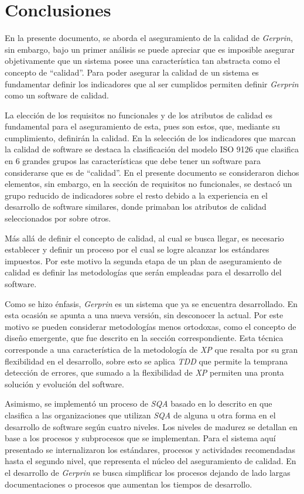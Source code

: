 
\chapter{Conclusiones }

En la presente documento, se aborda el aseguramiento de la calidad de \textit{Gerprin}, sin embargo, bajo un primer análisis se puede apreciar que es imposible asegurar objetivamente que un sistema posee una característica tan abstracta como el concepto de “calidad”. Para poder asegurar la calidad de un sistema es fundamentar definir los indicadores que al ser cumplidos permiten definir \textit{Gerprin} como un software de calidad.

La elección de los requisitos no funcionales y de los atributos de calidad es fundamental para el aseguramiento de esta, pues son estos, que, mediante su cumplimiento, definirán la calidad. En la selección de los indicadores que marcan la calidad de software se destaca la clasificación del modelo ISO 9126 que clasifica en 6 grandes grupos las características que debe tener un software para considerarse que es de “calidad”. En el presente documento se consideraron dichos elementos, sin embargo, en la sección de requisitos no funcionales, se destacó un grupo reducido de indicadores sobre el resto debido a la experiencia en el desarrollo de software similares, donde primaban los atributos de calidad seleccionados por sobre otros.

Más allá de definir el concepto de calidad, al cual se busca llegar, es necesario establecer y definir un proceso por el cual se logre alcanzar los estándares impuestos. Por este motivo la segunda etapa de un plan de aseguramiento de calidad es definir las metodologías que serán empleadas para el desarrollo del software. 

Como se hizo énfasis, \textit{Gerprin} es un sistema que ya se encuentra desarrollado. En esta ocasión se apunta a una nueva versión, sin desconocer la actual. Por este motivo se pueden considerar metodologías menos ortodoxas, como el concepto de diseño emergente, que fue descrito en la sección correspondiente. Esta técnica corresponde a una característica de la metodología de \textit{XP} que resalta por su gran flexibilidad en el desarrollo, sobre esto se aplica \textit{TDD} que permite la temprana detección de errores, que sumado a la flexibilidad de \textit{XP} permiten una pronta solución y evolución del software.

Asimismo, se implementó un proceso de \textit{SQA} basado en lo descrito en \citet{web00} que clasifica a las organizaciones que utilizan \textit{SQA} de alguna u otra forma en el desarrollo de software según cuatro niveles. Los niveles de madurez se detallan en base a los procesos y subprocesos que se implementan. Para el sistema aquí presentado se internalizaron los estándares, procesos y actividades recomendadas hasta el segundo nivel, que representa el núcleo del aseguramiento de calidad. En el desarrollo de \textit{Gerprin} se busca simplificar los procesos dejando de lado largas documentaciones o procesos que aumentan los tiempos de desarrollo. 

